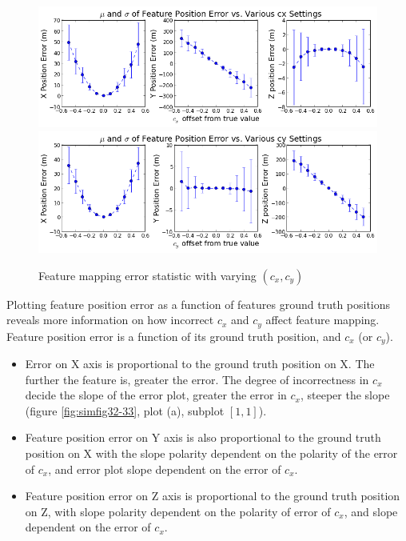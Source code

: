 \begin{figure}[h]
  \centering
  \includegraphics[scale=0.5]{./Figures/SimulationFigures/Figure28.png}
  \includegraphics[scale=0.5]{./Figures/SimulationFigures/Figure29.png}
  \caption{Feature mapping error statistic with varying $(c_x, c_y)$}
  \label{fig:simfig28-29}
\end{figure}

Plotting feature position error as a function of features ground truth 
positions reveals more information on how incorrect $c_{x}$ and $
c_{y}$ affect feature mapping. Feature position error is a function of 
its ground truth position, and $c_{x}$ (or $c_{y}$). 

\begin{itemize}
  \item Error on X axis is proportional to the ground truth position
  on X. The further the feature is, greater the error. The degree of
  incorrectness in $c_{x}$ decide the slope of the error plot, greater
  the error in $c_{x}$, steeper the slope (figure
  \ref{fig:simfig32-33}, plot (a), subplot $[1,1]$).
  \item Feature position error on Y axis is also proportional to the
  ground truth position on X with the slope polarity dependent on the
  polarity of the error of $c_{x}$, and error plot slope dependent on
  the error of $c_{x}$.
  \item Feature position error on Z axis is proportional to the ground
  truth position on Z, with slope polarity dependent on the polarity
  of error of $c_{x}$, and slope dependent on the error of $c_{x}$.
\end{itemize}

